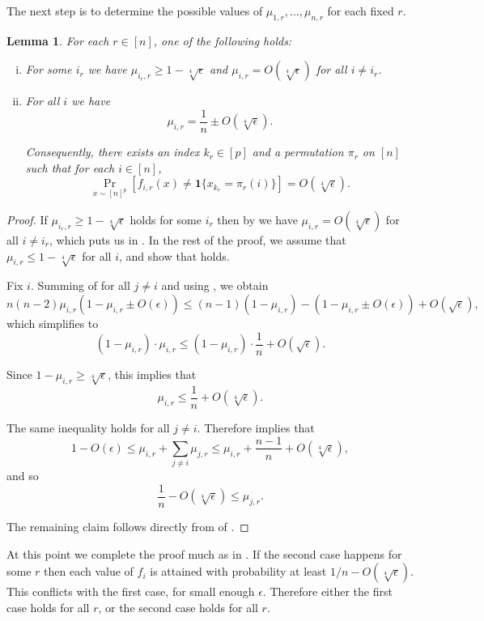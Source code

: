 \documentclass{article}
\providecommand{\ind}[1]{\mathbf1\{#1\}}
\newtheorem{lemma}[theorem]{Lemma}
\theoremstyle{definition}
\theoremstyle{remark}
\begin{document}
The next step is to determine the possible values of $\mu_{1,r},\dots,\mu_{n,r}$ for each fixed $r$.

\begin{lemma}
\label{lem:mu-*-r}
For each $r \in [n]$, one of the following holds:
\begin{enumerate}[(i)]
\item For some $i_r$ we have $\mu_{i_r,r} \ge 1 - \sqrt[4]{\epsilon}$ and $\mu_{i,r} = O(\sqrt[4]{\epsilon})$ for all $i \neq i_r$.
\label{itm:mu-*-r-const}
\item For all $i$ we have
\[
 \mu_{i,r} = \frac{1}{n} \pm O(\sqrt[4]{\epsilon}).
\]

Consequently, there exists an index $k_r \in [p]$ and a permutation $\pi_r$ on $[n]$ such that for each $i \in [n]$,
\label{itm:mu-*-r-dict}
\[
 \Pr_{x \sim [n]^p}[f_{i,r}(x) \neq \ind{x_{k_r} = \pi_r(i)}] = O(\sqrt[4]{\epsilon}).
\]
\end{enumerate}
\end{lemma}
\begin{proof}
If $\mu_{i_r,r} \ge 1 - \sqrt[4]{\epsilon}$ holds for some $i_r$ then by  we have $\mu_{i,r} = O(\sqrt[4]{\epsilon})$ for all $i \neq i_r$, which puts us in .
In the rest of the proof, we assume that $\mu_{i,r} \leq 1 - \sqrt[4]{\epsilon}$ for all $i$, and show that  holds.

Fix $i$. Summing  of  for all $j \neq i$ and using , we obtain
\[
 n(n-2) \mu_{i,r} (1-\mu_{i,r} \pm O(\epsilon)) \leq (n-1)(1-\mu_{i,r}) - (1-\mu_{i,r} \pm O(\epsilon)) + O(\sqrt{\epsilon}),
\]
which simplifies to
\[
  (1-\mu_{i,r}) \cdot \mu_{i,r} \leq (1-\mu_{i,r}) \cdot \frac{1}{n} + O(\sqrt{\epsilon}).
\]

Since $1 - \mu_{i,r} \ge \sqrt[4]{\epsilon}$, this implies that
\[
 \mu_{i,r} \leq \frac{1}{n} + O(\sqrt[4]{\epsilon}).
\]

The same inequality holds for all $j \neq i$. Therefore  implies that
\[
 1 - O(\epsilon) \leq \mu_{i,r} + \sum_{j \neq i} \mu_{j,r} \leq \mu_{i,r} + \frac{n-1}{n} + O(\sqrt[4]{\epsilon}),
\]
and so
\[
 \frac{1}{n} - O(\sqrt[4]{\epsilon}) \leq \mu_{j,r}.
\]

The remaining claim follows directly from  of .
\end{proof}

At this point we complete the proof much as in . If the second case happens for some $r$ then each value of $f_i$ is attained with probability at least $1/n - O(\sqrt[4]{\epsilon})$. This conflicts with the first case, for small enough $\epsilon$. Therefore either the first case holds for all $r$, or the second case holds for all $r$.
\end{document}
